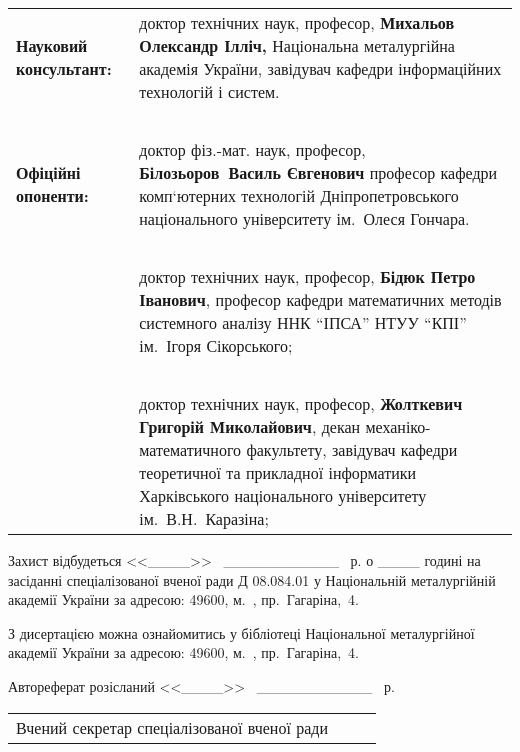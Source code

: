 \documentclass[a4paper,12pt]{atuaref}
\renewcommand{\SekrRadi}{\dissSekrRadi}
\begin{document}
\noindent
\begin{tabular}{lp{}}
\textbf{Науковий консультант:}
&
доктор технічних наук, професор,\newline
\textbf{Михальов Олександр Ілліч,}\newline
Національна металургійна академія України,
завідувач кафедри інформаційних технологій і систем.
\\
{~} & {~}
\\
\textbf{Офіційні опоненти:}
{~}
&
доктор фіз.-мат. наук, професор,\newline
\textbf{Білозьоров~Василь Євгенович}
професор кафедри комп`ютерних технологій
Дніпропетровського національного університету
ім.~Олеся Гончара.
\\
{~} & {~}
\\
&
доктор технічних наук, професор,\newline
\textbf{Бідюк Петро Іванович},
  професор кафедри математичних методів системного аналізу ННК ``ІПСА'' НТУУ ``КПІ'' ім.~Ігоря Сікорського;
\\
{~} & {~}
\\
{~}
&
доктор технічних наук, професор,\newline
\textbf{Жолткевич Григорій Миколайович},
  декан механіко-математичного факультету,
  завідувач кафедри теоретичної та прикладної інформатики
  Харківського національного університету ім.~В.Н.~Каразіна;
\end{tabular}

\vspace{5ex plus 4ex}


\vfill

Захист відбудеться
<<\_\_\_\_>>
~\_\_\_\_\_\_\_\_\_\_\_
\bookyear~р. о \_\_\_\_ годині
на засіданні спеціалізованої вченої ради Д 08.084.01 у Національній
металургійній академії України за адресою: 49600, м.~\cityUa,
пр.~Гагаріна,~4.


\vspace{4ex plus 3ex}
З дисертацією можна ознайомитись у бібліотеці Національної металургійної
академії України за адресою: 49600, м.~\cityUa, пр.~Гагаріна,~4.

\vspace{4ex plus 3ex}
Автореферат розісланий 
<<\_\_\_\_>>
~\_\_\_\_\_\_\_\_\_\_\_
\bookyear~р.

\vspace{4ex plus 3ex}

\begin{tabular}{p{}p{}p{}}
Вчений секретар спеціалізованої вченої ради 
&
{~}
&
\SekrRadi
\end{tabular}
\end{document}
